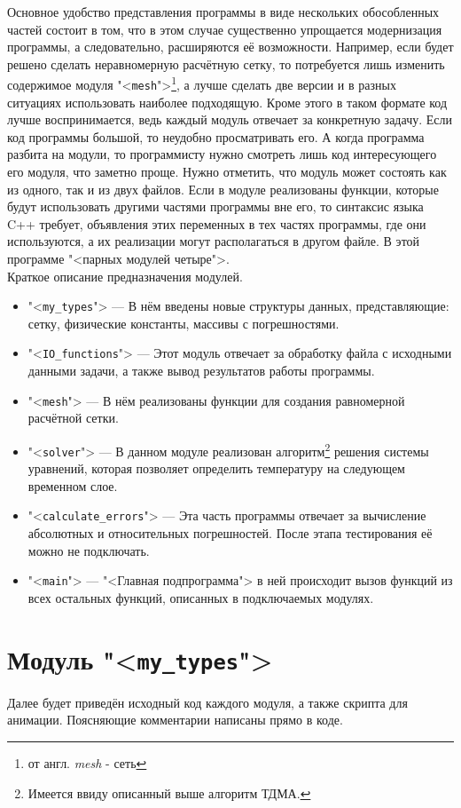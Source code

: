 \documentclass[oneside, final, 14pt]{report}
\begin{document}
Основное удобство представления программы в виде нескольких обособленных частей состоит в том, что в этом случае существенно упрощается модернизация программы, а следовательно, расширяются её возможности. Например, если будет решено сделать неравномерную расчётную сетку, то потребуется лишь изменить содержимое модуля "<\texttt{mesh}">\footnote{от англ. \emph{mesh} - сеть}, а лучше сделать две версии и в разных ситуациях использовать наиболее подходящую. Кроме этого в таком формате код лучше воспринимается, ведь каждый модуль отвечает за конкретную задачу. Если код программы большой, то неудобно просматривать его. А когда программа разбита на модули, то программисту нужно смотреть лишь код интересующего его модуля, что заметно проще. Нужно отметить, что модуль может состоять как из одного, так и из двух файлов. Если в модуле реализованы функции, которые будут использовать другими частями программы вне его, то синтаксис языка C++ требует, объявления этих переменных в тех частях программы, где они используются, а их реализации могут располагаться в другом файле. В этой программе "<парных модулей четыре">. \\
Краткое описание предназначения модулей.
\begin{itemize}
 \item "<\texttt{my\_types}"> --- В нём введены новые структуры данных, представляющие: сетку, физические константы, массивы с погрешностями.
 \item "<\texttt{IO\_functions}"> --- Этот модуль отвечает за обработку файла с исходными данными задачи, а также вывод результатов работы программы.
 \item "<\texttt{mesh}"> --- В нём реализованы функции для создания равномерной расчётной сетки.
 \item "<\texttt{solver}"> --- В данном модуле реализован алгоритм\footnote{Имеется ввиду описанный выше алгоритм ТДМА.} решения системы уравнений, которая позволяет определить температуру на следующем временном слое. 
 \item "<\texttt{calculate\_errors}"> --- Эта часть программы отвечает за вычисление абсолютных и относительных погрешностей. После этапа тестирования её можно не подключать.
 \item "<\texttt{main}"> --- "<Главная подпрограмма"> в ней происходит вызов функций из всех остальных функций, описанных в подключаемых модулях. 
\end{itemize}
\newpage
\section{Модуль "<\texttt{my\_types}">}
\large
{}
\Large
Далее будет приведён исходный код каждого модуля, а также скрипта для анимации. Поясняющие комментарии написаны прямо в коде. 
\end{document}
